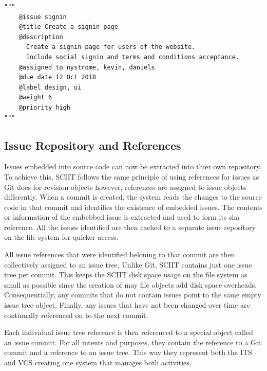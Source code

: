 \documentclass{mproj}
\newenvironment{code}{\captionsetup{type=listing}}{}
\begin{document}
\begin{code}
\label{snip:embedded-issue}
\begin{verbatim}
"""
    @issue signin
    @title Create a signin page
    @description
      Create a signin page for users of the website. 
      Include social signin and terms and conditions acceptance.
    @assigned to nystrome, kevin, daniels
    @due date 12 Oct 2018
    @label design, ui
    @weight 6
    @priority high    
"""
\end{verbatim}
\end{code}




\subsection{Issue Repository and References}

Issues embedded into source code can now be extracted into thier own repository. To achieve this, SCIIT follows the same principle of using references for issues as Git does for revision objects however, references are assigned to issue objects differently. When a commit is created, the system reads the changes to the source code in that commit and identifies the existence of embedded issues. The contents or information of the embebbed issue is extracted and used to form its sha reference. All the issues identified are then cached to a separate issue repository on the file system for quicker access. 

All issue references that were identified beloning to that commit are then collectively assigned to an issue tree. Unlike Git, SCIIT contains just one issue tree per commit. This keeps the SCIIT disk space usage on the file system as small as possible since the creation of may file objects add disk space overheads. Consequentially, any commits that do not contain issues point to the same empty issue tree object. Finally, any issues that have not been changed over time are continually referenced on to the next commit.

Each individual issue tree reference is then referenced to a special object called an issue commit. For all intents and purposes, they contain the reference to a Git commit and a reference to an issue tree. This way they represent both the ITS and VCS creating one system that manages both activities. 
\end{document}
